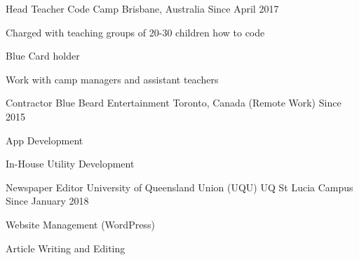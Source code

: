 


\begin{cventries}


\cventry
{Head Teacher} %
{Code Camp} %
{Brisbane, Australia} %
{Since April 2017} %
{ %
\begin{cvitems}
\item {Charged with teaching groups of 20-30 children how to code}
\item {Blue Card holder}
\item {Work with camp managers and assistant teachers}
\end{cvitems}
}


\cventry
{Contractor} %
{Blue Beard Entertainment} %
{Toronto, Canada (Remote Work)} %
{Since 2015} %
{ %
\begin{cvitems}
\item {App Development}
\item {In-House Utility Development}
\end{cvitems}
}


\cventry
{Newspaper Editor} %
{University of Queensland Union (UQU)} %
{UQ St Lucia Campus} %
{Since January 2018} %
{ %
\begin{cvitems}
\item {Website Management (WordPress)}
\item {Article Writing and Editing}
\end{cvitems}
}


\end{cventries}